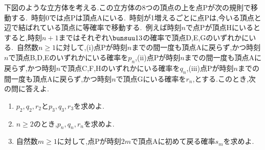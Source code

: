 \begin{problem}
下図のような立方体を考える.この立方体の8つの頂点の上を点Pが次の規則で移動する.\, 時刻0では点Pは頂点Aにいる.\, 時刻が1増えるごとに点Pは,今いる頂点と辺で結ばれている頂点に等確率で移動する.\, 例えば時刻$n$で点Pが頂点Hにいるとすると,時刻$n+1$まではそれぞれ$\bunsuu13$の確率で頂点D,E,Gのいずれかにいる.\, 自然数$n \geq 1$に対して,(i)点Pが時刻$n$までの間一度も頂点Aに戻らず,かつ時刻$n$で頂点B,D,Eのいずれかにいる確率を$p_n$,(ii)点Pが時刻$n$までの間一度も頂点Aに戻らず,かつ時刻$n$で頂点C,F,Hのいずれかにいる確率を$q_n$,(iii)点Pが時刻$n$までの間一度も頂点Aに戻らず,かつ時刻$n$で頂点Gにいる確率を$r_n$,とする.このとき,次の問に答えよ.
  \begin{enumerate}
    \item $p_2,q_2,r_2$と$p_3,q_3,r_3$を求めよ.
    \item $n \geq 2$のとき,$p_n,q_n,r_n$を求めよ.
    \item 自然数$m \geq 1$に対して,点Pが時刻$2m$で頂点Aに初めて戻る確率$s_m$を求めよ.
  \end{enumerate}
\end{problem}
